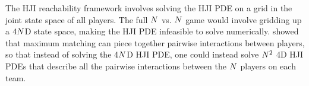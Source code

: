 The HJI reachability framework involves solving the HJI PDE on a grid in the joint state space of all players. The full $N$ vs. $N$ game would involve gridding up a $4N$D state space, making the HJI PDE infeasible to solve numerically. \cite{Chen2014} showed that maximum matching can piece together pairwise interactions between players, so that instead of solving the 4$N$D HJI PDE, one could instead solve $N^2$ 4D HJI PDEs that describe all the pairwise interactions between the $N$ players on each team. %
